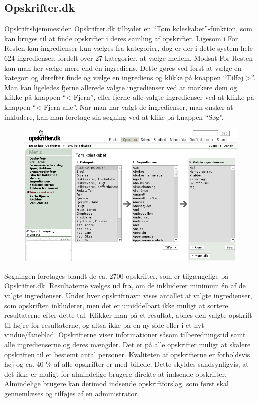 \subsection{Opskrifter.dk}
Opskriftshjemmesiden Opskrifter.dk tilbyder en ``Tøm køleskabet''-funktion, som kan bruges til at finde opskrifter i deres samling af opskrifter. Ligesom i For Resten kan ingredienser kun vælges fra kategorier, dog er der i dette system hele 624 ingredienser, fordelt over 27 kategorier, at vælge mellem. Modsat For Resten kan man her vælge mere end én ingrediens. Dette gøres ved først at vælge en kategori og derefter finde og vælge en ingrediens og klikke på knappen ``Tilføj >''. Man kan ligeledes fjerne allerede valgte ingredienser ved at markere dem og klikke på knappen ``< Fjern'', eller fjerne alle valgte ingredienser ved at klikke på knappen ``< Fjern alle''. Når man har valgt de ingredienser, man ønsker at inkludere, kan man foretage sin søgning ved at klike på knappen ``Søg''. 

\begin{figure}[H]
\centering
\includegraphics[scale=0.7]{billeder/forbilleder/opskrifterdk.png}
\label{fig:opskrifterdk1}
\end{figure}

Søgningen foretages blandt de ca. 2700 opskrifter, som er tilgængelige på Opskrifter.dk. Resultaterne vælges ud fra, om de inkluderer minimum én af de valgte ingredienser. Under hver opskriftnavn vises antallet af valgte ingredienser, som opskriften inkluderer, men det er umiddelbart ikke muligt at sortere resultaterne efter dette tal. Klikker man på et resultat, åbnes den valgte opskrift til højre for resultaterne, og altså ikke på en ny side eller i et nyt vindue/faneblad. Opskrifterne viser informationer såsom tilberedningstid samt alle ingredienserne og deres mængder. Det er på alle opskrifter muligt at skalere opskriften til et bestemt antal personer. Kvaliteten af opskrifterne er forholdsvis høj og ca. 40 \% af alle opskrifter er med billede. Dette skyldes sandsynligvis, at det ikke er muligt for almindelige brugere direkte at indsende opskrifter. Almindelige brugere kan derimod indsende opskriftforslag, som først skal gennemlæses og tilføjes af en administrator.

